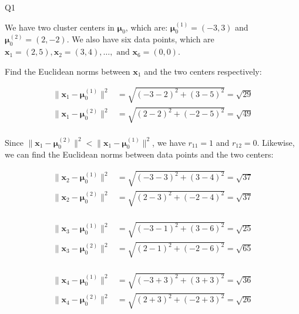 \question Q1\droppoints

\begin{solution}
     We have two cluster centers in $\bm{\mu}_0$, which are: $\bm{\mu}^{(1)}_0 = (-3, 3)$ and $\bm{\mu}^{(2)}_0 = (2, -2)$.
    We also have six data points, which are $\bm{x}_1 = (2, 5), \bm{x}_2 = (3, 4), \dots ,\text{ and } \bm{x}_6 = (0, 0)$.

    Find the Euclidean norms between $\bm{x}_1$ and the two centers respectively:

    \[
        \begin{align*}
            \lVert \bm{x}_1 - \bm{\mu}^{(1)}_0 \rVert^2 &= \sqrt{(-3 - 2)^2 + (3 - 5)^2} = \sqrt{29} \\
            \lVert \bm{x}_1 - \bm{\mu}^{(2)}_0 \rVert^2 &= \sqrt{(2 - 2)^2 + (-2 - 5)^2} = \sqrt{49} \\
        \end{align*}
    \]

    Since $\lVert \bm{x}_1 - \bm{\mu}^{(2)}_0 \rVert^2 < \lVert \bm{x}_1 - \bm{\mu}^{(1)}_0 \rVert^2$, we have $r_{11} = 1$ and $r_{12} = 0$.
    Likewise, we can find the Euclidean norms between data points and the two centers:

    \[
        \begin{align*}
            \lVert \bm{x}_2 - \bm{\mu}^{(1)}_0 \rVert^2 &= \sqrt{(-3 - 3)^2 + (3 - 4)^2} = \sqrt{37} \\
            \lVert \bm{x}_2 - \bm{\mu}^{(2)}_0 \rVert^2 &= \sqrt{(2 - 3)^2 + (-2 - 4)^2} = \sqrt{37} \\
        \end{align*}
    \]

    \[
        \begin{align*}
            \lVert \bm{x}_3 - \bm{\mu}^{(1)}_0 \rVert^2 &= \sqrt{(-3 - 1)^2 + (3 - 6)^2} = \sqrt{25} \\
            \lVert \bm{x}_3 - \bm{\mu}^{(2)}_0 \rVert^2 &= \sqrt{(2 - 1)^2 + (-2 - 6)^2} = \sqrt{65} \\
        \end{align*}
    \]

    \[
        \begin{align*}
            \lVert \bm{x}_4 - \bm{\mu}^{(1)}_0 \rVert^2 &= \sqrt{(-3 + 3)^2 + (3 + 3)^2} = \sqrt{36} \\
            \lVert \bm{x}_4 - \bm{\mu}^{(2)}_0 \rVert^2 &= \sqrt{(2 + 3)^2 + (-2 + 3)^2} = \sqrt{26} \\
        \end{align*}
    \]


\end{solution}
